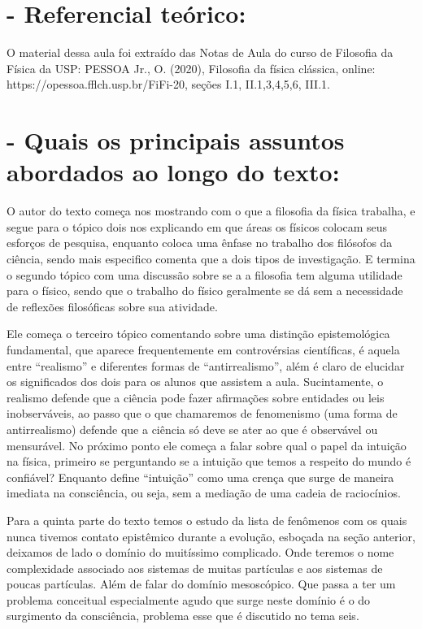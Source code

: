 \documentclass [a4paper, 12pt]{article}
\begin{document}
\section*{- Referencial teórico:}

 O material dessa aula foi extraído das Notas de Aula do curso de Filosofia da Física da USP: PESSOA Jr., O. (2020), Filosofia da física clássica, online: https://opessoa.fflch.usp.br/FiFi-20, seções I.1, II.1,3,4,5,6, III.1.


\section*{- Quais os principais assuntos abordados ao longo do texto:}

O autor do texto começa nos mostrando com o que a filosofia da física trabalha, e segue para o tópico dois nos explicando em que áreas os físicos colocam seus esforços de pesquisa, enquanto coloca uma ênfase no trabalho dos filósofos da ciência, sendo mais especifico comenta que a dois tipos de investigação. E termina o segundo tópico com uma discussão sobre se a a filosofia tem alguma utilidade para o físico, sendo que o trabalho do físico geralmente se dá sem a necessidade de reflexões filosóficas sobre sua atividade.

Ele começa o terceiro tópico comentando sobre uma distinção epistemológica fundamental, que aparece frequentemente em controvérsias científicas, é aquela entre “realismo” e diferentes formas de “antirrealismo”, além é claro de elucidar os significados dos dois para os alunos que assistem a aula. Sucintamente, o realismo defende que a ciência pode fazer afirmações sobre entidades ou leis inobserváveis, ao passo que o que chamaremos de fenomenismo (uma forma de antirrealismo) defende que a ciência só deve se ater ao que é observável ou mensurável. No próximo ponto ele começa a falar sobre qual o papel da intuição na física, primeiro se perguntando se a intuição que temos a respeito do mundo é confiável? Enquanto define “intuição” como uma crença que surge de maneira imediata na consciência, ou seja, sem a mediação de uma cadeia de raciocínios.

Para a quinta parte do texto temos o estudo da lista de fenômenos com os quais nunca tivemos contato epistêmico durante a evolução, esboçada na seção anterior, deixamos de lado o domínio do muitíssimo complicado. Onde teremos o nome complexidade associado aos sistemas de muitas partículas e aos sistemas de poucas partículas. Além de falar do domínio mesoscópico. Que passa a ter um problema conceitual especialmente agudo que surge neste domínio é o do surgimento da consciência, problema esse que é discutido no tema seis. 
\end{document}
